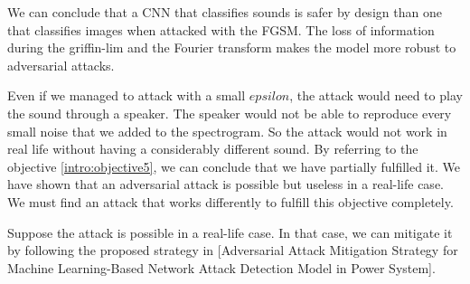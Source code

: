 We can conclude that a CNN that classifies sounds is safer by design than one that classifies images when attacked with the FGSM. The loss of information during the griffin-lim and the Fourier transform makes the model more robust to adversarial attacks. 

Even if we managed to attack with a small $epsilon$, the attack would need to play the sound through a speaker. The speaker would not be able to reproduce every small noise that we added to the spectrogram. So the attack would not work in real life without having a considerably different sound.
By referring to the objective \ref{intro:objective5}, we can conclude that we have partially fulfilled it. We have shown that an adversarial attack is possible but useless in a real-life case. We must find an attack that works differently to fulfill this objective completely.

Suppose the attack is possible in a real-life case. In that case, we can mitigate it by following the proposed strategy in [Adversarial Attack Mitigation Strategy for Machine Learning-Based Network Attack Detection Model in Power System]\cite{9930820}.